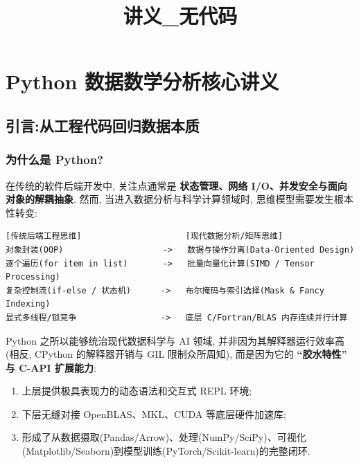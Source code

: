 \documentclass[11pt]{article}
\title{讲义\_无代码}
\providecommand{\tightlist}{%
      \setlength{\itemsep}{0pt}\setlength{\parskip}{0pt}}
\begin{document}
    
    \maketitle
    
    

    
    \section{Python
数据数学分析核心讲义}\label{python-ux6570ux636eux6570ux5b66ux5206ux6790ux6838ux5fc3ux8bb2ux4e49}

    \subsection{引言:从工程代码回归数据本质}\label{ux5f15ux8a00ux4eceux5de5ux7a0bux4ee3ux7801ux56deux5f52ux6570ux636eux672cux8d28}

    \subsubsection{为什么是 Python?}\label{ux4e3aux4ec0ux4e48ux662f-python}

    在传统的软件后端开发中, 关注点通常是 \textbf{状态管理、网络
I/O、并发安全与面向对象的解耦抽象}. 然而,
当进入数据分析与科学计算领域时, 思维模型需要发生根本性转变:

\begin{verbatim}
[传统后端工程思维]                     [现代数据分析/矩阵思维]
对象封装(OOP)                    ->   数据与操作分离(Data-Oriented Design)
逐个遍历(for item in list)       ->   批量向量化计算(SIMD / Tensor Processing)
复杂控制流(if-else / 状态机)      ->   布尔掩码与索引选择(Mask & Fancy Indexing)
显式多线程/锁竞争                 ->   底层 C/Fortran/BLAS 内存连续并行计算
\end{verbatim}

Python 之所以能够统治现代数据科学与 AI 领域,
并非因为其解释器运行效率高(相反, CPython 的解释器开销与 GIL
限制众所周知), 而是因为它的 \textbf{``胶水特性'' 与 C-API 扩展能力}:

\begin{enumerate}
\def\labelenumi{\arabic{enumi}.}
\tightlist
\item
  上层提供极具表现力的动态语法和交互式 REPL 环境;
\item
  下层无缝对接 OpenBLAS、MKL、CUDA 等底层硬件加速库;
\item
  形成了从数据摄取(Pandas/Arrow)、处理(NumPy/SciPy)、可视化(Matplotlib/Seaborn)到模型训练(PyTorch/Scikit-learn)的完整闭环.
\end{enumerate}
\end{document}
